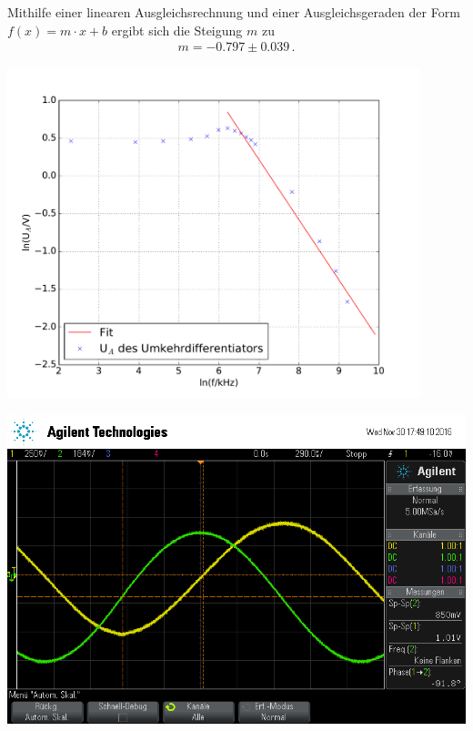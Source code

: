 \documentclass[]{scrartcl}
\begin{document}
Mithilfe einer linearen Ausgleichsrechnung und einer Ausgleichsgeraden der Form $f(x)=m\cdot x +b$ ergibt sich die Steigung $m$ zu
\begin{align*}
m = -0.797 \pm 0.039\,.
\end{align*}
\begin{center}
	\includegraphics[width=12cm]{images/differentiator.pdf}
	\label{fig:differentiator}
\end{center}
\begin{minipage}[t]{0.5\textwidth}
	\includegraphics[width=\textwidth]{images/sinus_diff}
	\label{fig:sinusdiff}
\end{minipage}
\hspace{0.1\textwidth}
\end{document}
